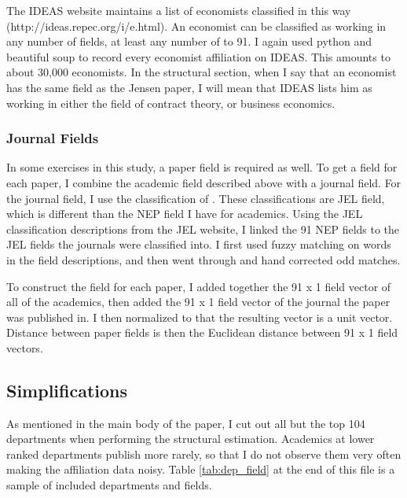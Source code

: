 The IDEAS website maintains a list of economists classified in this way
(http://ideas.repec.org/i/e.html). An economist can be classified as
working in any number of fields, at least any number of to 91. I again
used python and beautiful soup to record every economist affiliation on
IDEAS. This amounts to about 30,000 economists. In the structural
section, when I say that an economist has the same field as the Jensen
paper, I will mean that IDEAS lists him as working in either the field
of contract theory, or business economics.

\subsubsection{Journal Fields}

In some exercises in this study, a paper field is required as well. To
get a field for each paper, I combine the academic field described above
with a journal field. For the journal field, I use the classification of
\citet{barrett2000subdiscipline}. These classifications are JEL field,
which is different than the NEP field I have for academics. Using the JEL
classification descriptions from the JEL website, I linked the 91 NEP
fields to the JEL fields the journals were classified into. I first used
fuzzy matching on words in the field descriptions, and then went through
and hand corrected odd matches.

To construct the field for each paper, I added together the 91 x 1 field
vector of all of the academics, then added the 91 x 1 field vector of the
journal the paper was published in. I then normalized to that the
resulting vector is a unit vector. Distance between paper fields is then
the Euclidean distance between 91 x 1 field vectors.

\subsection{Simplifications}

As mentioned in the main body of the paper, I cut out all but the
top 104 departments when performing the structural estimation. Academics
at lower ranked departments publish more rarely, so that I do not
observe them very often making the affiliation data noisy. Table \ref{tab:dep_field} at
the end of this file is a sample of included departments and fields.

